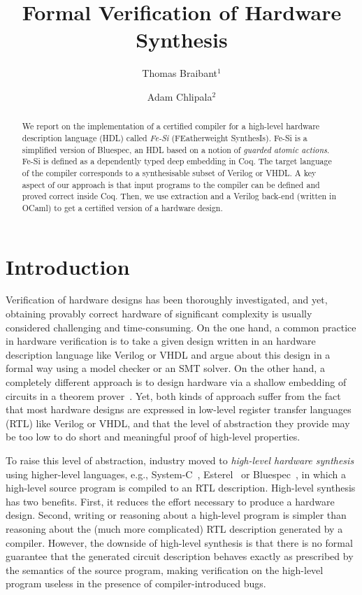 \documentclass{llncs}
\author{Thomas Braibant$^1$ \and Adam Chlipala${}^{2}$}
\institute{${}^1$ Inria \qquad ${}^2$ MIT} %
\title{Formal Verification of Hardware Synthesis}
\begin{document}
\maketitle

\begin{abstract}
  We report on the implementation of a certified compiler for a
  high-level hardware description language (HDL) called \emph{Fe-Si}
  (FEatherweight SynthesIs).
  Fe-Si is a simplified version of Bluespec, an HDL based on a notion
  of \emph{guarded atomic actions}. Fe-Si is defined as a
  dependently typed deep embedding in Coq. The target language of the
  compiler corresponds to a synthesisable subset of Verilog or VHDL.
  A key aspect of our approach is that input programs to the compiler
  can be defined and proved correct inside Coq. Then, we use
  extraction and a Verilog back-end (written in OCaml) to get a
  certified version of a hardware design.
\end{abstract}

\section*{Introduction}
Verification of hardware designs has been thoroughly investigated, and
yet, obtaining provably correct hardware of significant complexity is
usually considered challenging and time-consuming. 
%
On the one hand, a common practice in hardware verification is to take
a given design written in an hardware description language like
Verilog or VHDL and argue about this design in a formal way using a
model checker or an SMT solver.
%
On the other hand, a completely different approach is to design
hardware via a shallow embedding of circuits in a theorem
prover~\cite{hanna-veritas,UCAM-CL-TR-77,hunt89,vamp,certifying-circuits-in-type-theory}.
%
Yet, both kinds of approach suffer from the fact that most hardware
designs are expressed in low-level register transfer languages (RTL)
like Verilog or VHDL, and that the level of abstraction they provide
may be too low to do short and meaningful proof of high-level
properties.

\medskip

To raise this level of abstraction, industry moved to \emph{high-level
  hardware synthesis} using higher-level languages, e.g.,
System-C~\cite{systemc}, Esterel~\cite{DBLP:conf/birthday/Berry00} or
Bluespec~\cite{bluespec}, in which a high-level source program is
compiled to an RTL description.
%
High-level synthesis has two benefits. 
%
First, it reduces the effort necessary to produce a hardware design.
%
Second, writing or reasoning about a high-level program is simpler
than reasoning about the (much more complicated) RTL description
generated by a compiler.
%
However, the downside of high-level synthesis is that there is no
formal guarantee that the generated circuit description behaves
exactly as prescribed by the semantics of the source
program, making verification on the high-level program useless in the
presence of compiler-introduced bugs.
%
\end{document}
